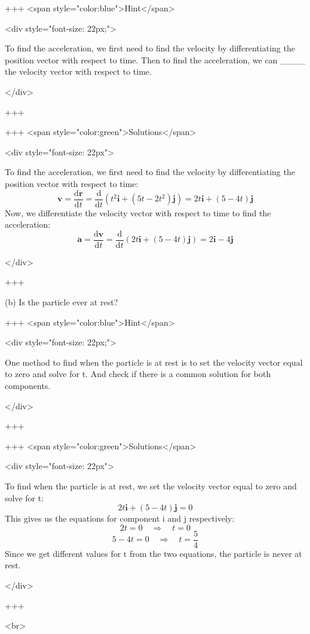 +++ <span style="color:blue">Hint</span>

<div style="font-size: 22px;">

To find the acceleration, we first need to find the velocity by differentiating the position vector with respect to time.
Then to find the acceleration, we can ____ the velocity vector with respect to time.

</div>

+++

+++ <span style="color:green">Solutions</span>

<div style="font-size: 22px">


To find the acceleration, we first need to find the velocity by differentiating the position vector with respect to time:
\[\mathbf{v}=\frac{\mathrm{d} \mathbf{r}}{\mathrm{d} t}=\frac{\mathrm{d}}{\mathrm{d} t}\left(t^{2} \mathbf{i}+\left(5 t-2 t^{2}\right) \mathbf{j}\right)=2 t \mathbf{i}+(5-4 t) \mathbf{j}\]
Now, we differentiate the velocity vector with respect to time to find the acceleration:
\[\mathbf{a}=\frac{\mathrm{d} \mathbf{v}}{\mathrm{d} t}=\frac{\mathrm{d}}{\mathrm{d} t}\left(2 t \mathbf{i}+(5-4 t) \mathbf{j}\right)=2 \mathbf{i}-4 \mathbf{j}\]


</div>

+++


(b) Is the particle ever at rest?

+++ <span style="color:blue">Hint</span>

<div style="font-size: 22px;">

One method to find when the particle is at rest is to set the velocity vector equal to zero and solve for t. And check if there is a common solution for both components.

</div>

+++

+++ <span style="color:green">Solutions</span>

<div style="font-size: 22px">

To find when the particle is at rest, we set the velocity vector equal to zero and solve for t:
\[2 t \mathbf{i}+(5-4 t) \mathbf{j}=0\]
This gives us the equations for component i and j respectively:
\[2 t=0 \quad \Rightarrow \quad t=0\]
\[5-4 t=0 \quad \Rightarrow \quad t=\frac{5}{4}\]
Since we get different values for t from the two equations, the particle is never at rest.

</div>

+++

<br>

